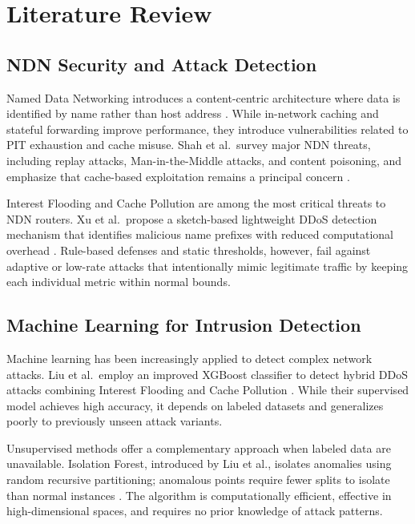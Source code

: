 \documentclass[12pt]{report}
\begin{document}
\chapter{Literature Review}

\section{NDN Security and Attack Detection}

Named Data Networking introduces a content-centric architecture where data is identified by name rather than host address \cite{zhang2010ndnproject}. While in-network caching and stateful forwarding improve performance, they introduce vulnerabilities related to PIT exhaustion and cache misuse. Shah et al.\ survey major NDN threats, including replay attacks, Man-in-the-Middle attacks, and content poisoning, and emphasize that cache-based exploitation remains a principal concern \cite{shah2023security}.

Interest Flooding and Cache Pollution are among the most critical threats to NDN routers. Xu et al.\ propose a sketch-based lightweight DDoS detection mechanism that identifies malicious name prefixes with reduced computational overhead \cite{xu_persistent_detection}. Rule-based defenses and static thresholds, however, fail against adaptive or low-rate attacks that intentionally mimic legitimate traffic by keeping each individual metric within normal bounds.

\section{Machine Learning for Intrusion Detection}

Machine learning has been increasingly applied to detect complex network attacks. Liu et al.\ employ an improved XGBoost classifier to detect hybrid DDoS attacks combining Interest Flooding and Cache Pollution \cite{liu2025xgboost}. While their supervised model achieves high accuracy, it depends on labeled datasets and generalizes poorly to previously unseen attack variants.

Unsupervised methods offer a complementary approach when labeled data are unavailable. Isolation Forest, introduced by Liu et al., isolates anomalies using random recursive partitioning; anomalous points require fewer splits to isolate than normal instances \cite{liu2008isolation}. The algorithm is computationally efficient, effective in high-dimensional spaces, and requires no prior knowledge of attack patterns.
\end{document}
